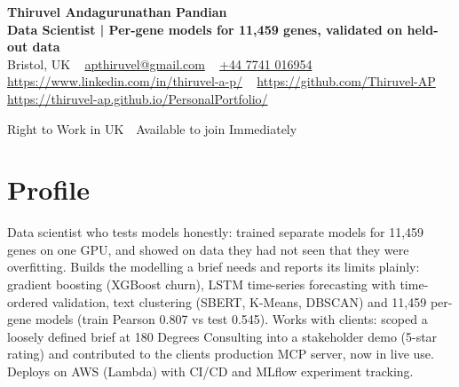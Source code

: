 \documentclass[a4paper,11pt]{article}
\begin{document}
\begin{center}
  {\LARGE\bfseries Thiruvel Andagurunathan Pandian} \\[3pt]
  {\color{headernavy}\small\textbf{Data Scientist | Per-gene models for 11,459 genes, validated on held-out data}} \\[3pt]
  {\small
  Bristol, UK\nobreak\ \,\textbar\, \href{mailto:apthiruvel@gmail.com}{apthiruvel@gmail.com}\nobreak\ \,\textbar\, \href{tel:+447741016954}{+44 7741 016954}\nobreak\ \,\textbar\, \href{https://www.linkedin.com/in/thiruvel-a-p/}{https://www.linkedin.com/in/thiruvel-a-p/}\nobreak\ \,\textbar\, \href{https://github.com/Thiruvel-AP}{https://github.com/Thiruvel-AP}\nobreak\ \,\textbar\, \href{https://thiruvel-ap.github.io/PersonalPortfolio/}{https://thiruvel-ap.github.io/PersonalPortfolio/}}\par\vspace{4pt}
  \noindent{} Right to Work in UK \,\textbar\, Available to join Immediately
\end{center}

\section{Profile}
Data scientist who tests models honestly: trained separate models for 11,459 genes on one GPU, and showed on data they had not seen that they were overfitting. Builds the modelling a brief needs and reports its limits plainly: gradient boosting (XGBoost churn), LSTM time-series forecasting with time-ordered validation, text clustering (SBERT, K-Means, DBSCAN) and 11,459 per-gene models (train Pearson 0.807 vs test 0.545). Works with clients: scoped a loosely defined brief at 180 Degrees Consulting into a stakeholder demo (5-star rating) and contributed to the client\textquotesingle{}s production MCP server, now in live use. Deploys on AWS (Lambda) with CI/CD and MLflow experiment tracking.
\end{document}
